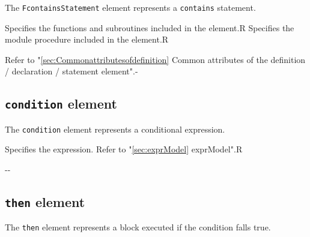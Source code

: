 The {\tt FcontainsStatement} element represents a {\tt contains} statement.


\begin{XcodeMLChildElements}
{Specifies the functions and subroutines included in the element.}{R}
{Specifies the module procedure included in the element.}{R}
\end{XcodeMLChildElements}

\begin{XcodeMLAttributes}
{Refer to "\ref{sec:Commonattributesofdefinition} Common attributes of the definition / declaration / statement element".}{-}
\end{XcodeMLAttributes}


\subsection{ {\tt condition} element}

The {\tt condition} element represents a conditional expression.


\begin{XcodeMLChildElements}
{Specifies the expression. Refer to "\ref{sec:exprModel} exprModel".}{R}
\end{XcodeMLChildElements}

\begin{XcodeMLAttributes}
\XcodeMLAttrDef{-}{-}
{-}{-}
\end{XcodeMLAttributes}


\subsection{ {\tt then} element}

The {\tt then} element represents a block executed if the condition falls true.

